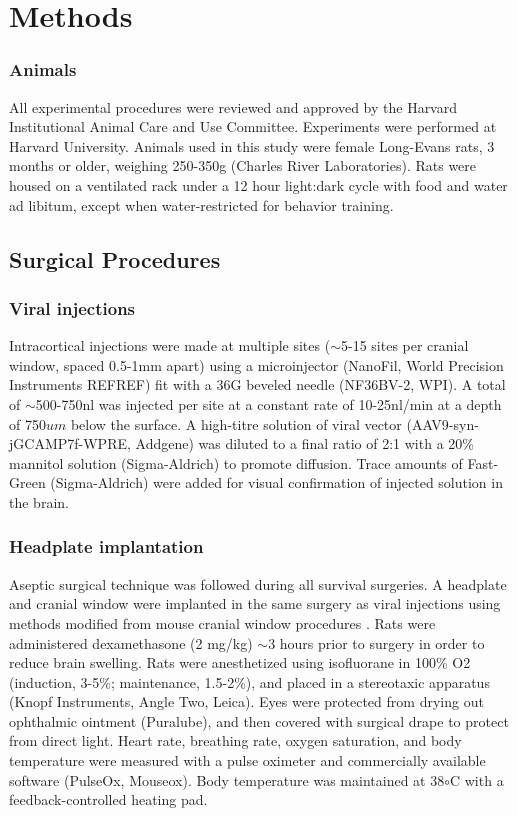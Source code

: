\chapter{Methods}
\label{methods}



\subsection{Animals}
All experimental procedures were reviewed and approved by the Harvard Institutional Animal Care and Use Committee. Experiments were performed at Harvard University. Animals used in this study were female Long-Evans rats, 3 months or older, weighing 250-350g (Charles River Laboratories). Rats were housed on a ventilated rack under a 12 hour light:dark cycle with food and water ad libitum, except when water-restricted for behavior training. 

\section{Surgical Procedures}
\subsection{Viral injections}
Intracortical injections were made at multiple sites ($\sim$5-15 sites per cranial window, spaced 0.5-1mm apart) using a microinjector (NanoFil, World Precision Instruments REFREF) fit with a 36G beveled needle (NF36BV-2, WPI). A total of $\sim$500-750nl was injected per site at a constant rate of 10-25nl/min at a depth of 750$um$ below the surface. A high-titre solution of viral vector (AAV9-syn-jGCAMP7f-WPRE, Addgene) was diluted to a final ratio of 2:1 with a 20\% mannitol solution (Sigma-Aldrich) to promote diffusion. Trace amounts of Fast-Green (Sigma-Aldrich) were added for visual confirmation of injected solution in the brain.

\subsection{Headplate implantation}
Aseptic surgical technique was followed during all survival surgeries. A headplate and cranial window were implanted in the same surgery as viral injections using methods modified from mouse cranial window procedures \cite{Goldey2014}. Rats were administered dexamethasone (2 mg/kg) $\sim$3 hours prior to surgery in order to reduce brain swelling. Rats were anesthetized using isofluorane in 100\% O2 (induction, 3-5\%; maintenance, 1.5-2\%), and placed in a stereotaxic apparatus (Knopf Instruments, Angle Two, Leica). Eyes were protected from drying out ophthalmic ointment (Puralube), and then covered with surgical drape to protect from direct light. Heart rate, breathing rate, oxygen saturation, and body temperature were measured with a pulse oximeter and commercially available software (PulseOx, Mouseox). Body temperature was maintained at 38$\circ$C with a feedback-controlled heating pad. 

